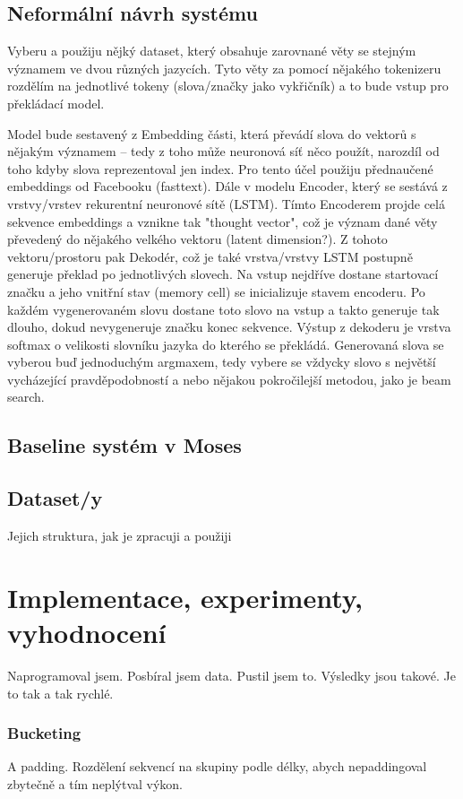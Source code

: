 \section{Neformální návrh systému}
Vyberu a použiju nějký dataset, který obsahuje zarovnané věty se stejným významem ve dvou různých jazycích. Tyto věty za pomocí nějakého tokenizeru rozdělím na jednotlivé tokeny (slova/značky jako vykřičník) a to bude vstup pro překládací model.

Model bude sestavený z Embedding části, která převádí slova do vektorů s nějakým významem -- tedy z toho může neuronová síť něco použít, narozdíl od toho kdyby slova reprezentoval jen index. Pro tento účel použiju přednaučené embeddings od Facebooku (fasttext). Dále v modelu Encoder, který se sestává z vrstvy/vrstev rekurentní neuronové sítě (LSTM). Tímto Encoderem projde celá sekvence embeddings a vznikne tak "thought vector", což je význam dané věty převedený do nějakého velkého vektoru (latent dimension?). Z tohoto vektoru/prostoru pak Dekodér, což je také vrstva/vrstvy LSTM postupně generuje překlad po jednotlivých slovech. Na vstup nejdříve dostane startovací značku a jeho vnitřní stav (memory cell) se inicializuje stavem encoderu. Po každém vygenerovaném slovu dostane toto slovo na vstup a takto generuje tak dlouho, dokud nevygeneruje značku konec sekvence. Výstup z dekoderu je vrstva softmax o velikosti slovníku jazyka do kterého se překládá. Generovaná slova se vyberou buď jednoduchým argmaxem, tedy vybere se vždycky slovo s největší vycházející pravděpodobností a nebo nějakou pokročilejší metodou, jako je beam search.


\section{Baseline systém v Moses}

\section{Dataset/y}
Jejich struktura, jak je zpracuji a použiji

\chapter{Implementace, experimenty, vyhodnocení}
Naprogramoval jsem.
Posbíral jsem data.
Pustil jsem to.
Výsledky jsou takové.
Je to tak a tak rychlé.

\subsection{Bucketing}
A padding. Rozdělení sekvencí na skupiny podle délky, abych nepaddingoval zbytečně a tím neplýtval výkon.

